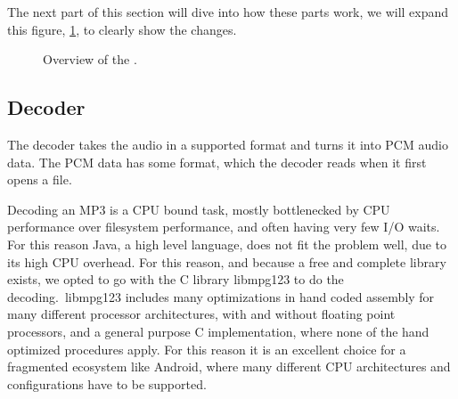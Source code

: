 The next part of this section will dive into how these parts work, we will expand this figure, \cref{fig:mediaplayerParts}, to clearly show the changes.


\begin{figure}[ht]
	\centering
	\caption{Overview of the .}\label{fig:mediaplayerParts}
\end{figure}

\subsection{Decoder}
\label{subsec:decoder}

The decoder takes the audio in a supported format and turns it into
\ac{PCM} audio data. The \ac{PCM} data has some format, which the
decoder reads when it first opens a file.

Decoding an MP3 is a CPU bound task, mostly bottlenecked by CPU
performance over filesystem performance, and often having very few I/O
waits. For this reason Java, a high level language, does not fit the
problem well, due to its high CPU overhead. For this reason, and because
a free and complete library exists, we opted to go with the C library
libmpg123 to do the decoding.\ libmpg123 includes many optimizations in
hand coded assembly for many different processor architectures, with and without
floating point processors, and a general purpose C implementation, where
none of the hand optimized procedures apply. For this reason it is an
excellent choice for a fragmented ecosystem like Android, where many
different CPU architectures and configurations have to be supported.

